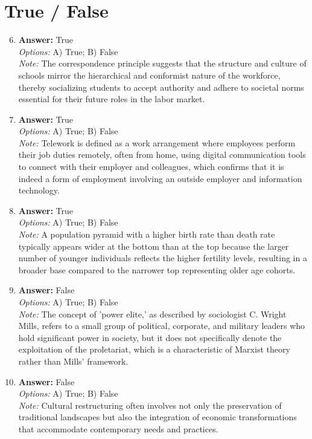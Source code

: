 \documentclass[12pt]{article}
\begin{document}
\section*{True / False}
\begin{enumerate}[label=\arabic*.]
\setcounter{enumi}{5}
\item \textbf{Answer:} True
\\ \textit{Options:} A) True; B) False
\\ \textit{Note:} The correspondence principle suggests that the structure and culture of schools mirror the hierarchical and conformist nature of the workforce, thereby socializing students to accept authority and adhere to societal norms essential for their future roles in the labor market.
\item \textbf{Answer:} True
\\ \textit{Options:} A) True; B) False
\\ \textit{Note:} Telework is defined as a work arrangement where employees perform their job duties remotely, often from home, using digital communication tools to connect with their employer and colleagues, which confirms that it is indeed a form of employment involving an outside employer and information technology.
\item \textbf{Answer:} True
\\ \textit{Options:} A) True; B) False
\\ \textit{Note:} A population pyramid with a higher birth rate than death rate typically appears wider at the bottom than at the top because the larger number of younger individuals reflects the higher fertility levels, resulting in a broader base compared to the narrower top representing older age cohorts.
\item \textbf{Answer:} False
\\ \textit{Options:} A) True; B) False
\\ \textit{Note:} The concept of 'power elite,' as described by sociologist C. Wright Mills, refers to a small group of political, corporate, and military leaders who hold significant power in society, but it does not specifically denote the exploitation of the proletariat, which is a characteristic of Marxist theory rather than Mills' framework.
\item \textbf{Answer:} False
\\ \textit{Options:} A) True; B) False
\\ \textit{Note:} Cultural restructuring often involves not only the preservation of traditional landscapes but also the integration of economic transformations that accommodate contemporary needs and practices.
\end{enumerate}
\end{document}
